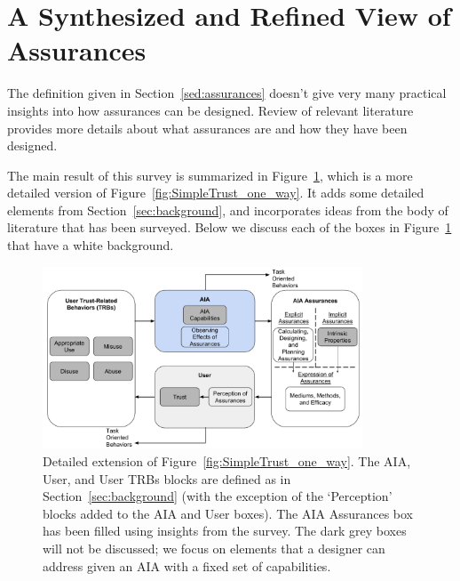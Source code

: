 \section{A Synthesized and Refined View of Assurances} \label{sec:synthesis}
    The definition given in Section~\ref{sed:assurances} doesn't give very many practical insights into how assurances can be designed. Review of relevant literature provides more details about what assurances are and how they have been designed.
    
    The main result of this survey is summarized in Figure~\ref{fig:refined_assurances}, which is a more detailed version of Figure~\ref{fig:SimpleTrust_one_way}. It adds some detailed elements from Section~\ref{sec:background}, and incorporates ideas from the body of literature that has been surveyed. Below we discuss each of the boxes in Figure~\ref{fig:refined_assurances} that have a white background.

    \begin{figure}[htbp]
        \centering
        \includegraphics[width=0.85\textwidth]{Figures/RefinedTrust_one_way}
        \caption{Detailed extension of Figure~\ref{fig:SimpleTrust_one_way}. The AIA, User, and User TRBs blocks are defined as in Section~\ref{sec:background} (with the exception of the `Perception' blocks added to the AIA and User boxes). The AIA Assurances box has been filled using insights from the survey. The dark grey boxes will not be discussed; we focus on elements that a designer can address given an AIA with a fixed set of capabilities.}
        \label{fig:refined_assurances}
    \end{figure}





